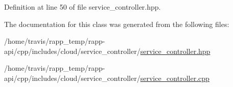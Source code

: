 Definition at line 50 of file service\-\_\-controller.\-hpp.



The documentation for this class was generated from the following files\-:\begin{DoxyCompactItemize}
\item 
/home/travis/rapp\-\_\-temp/rapp-\/api/cpp/includes/cloud/service\-\_\-controller/\hyperlink{service__controller_8hpp}{service\-\_\-controller.\-hpp}\item 
/home/travis/rapp\-\_\-temp/rapp-\/api/cpp/includes/cloud/service\-\_\-controller/\hyperlink{service__controller_8cpp}{service\-\_\-controller.\-cpp}\end{DoxyCompactItemize}
